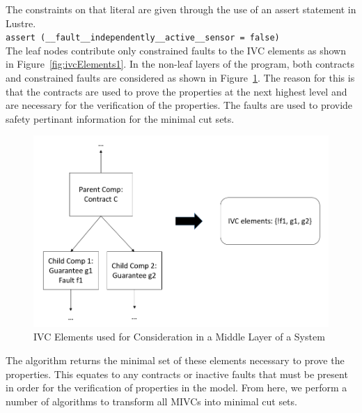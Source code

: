 The constraints on that literal are given through the use of an assert statement in Lustre.\\ \texttt{assert (\_\_fault\_\_independently\_\_active\_\_sensor = false)}\\

The leaf nodes contribute only constrained faults to the IVC elements as shown in Figure~\ref{fig:ivcElements1}. In the non-leaf layers of the program, both contracts and constrained faults are considered as shown in Figure~\ref{fig:ivcElements2}. The reason for this is that the contracts are used to prove the properties at the next highest level and are necessary for the verification of the properties. The faults are used to provide safety pertinant information for the minimal cut sets. 

\begin{figure}[htbp]
	\hspace*{-2cm}
	\vspace{-0.1in} 
	\begin{center}
		\includegraphics[scale=0.5]{images/ivcElements2.png}
	\caption{IVC Elements used for Consideration in a Middle Layer of a System}
		\label{fig:ivcElements2}
	\end{center}
\end{figure}

The \aivcalg algorithm returns the minimal set of these elements necessary to prove the properties. This equates to any contracts or inactive faults that must be present in order for the verification of properties in the model. From here, we perform a number of algorithms to transform all MIVCs into minimal cut sets.


